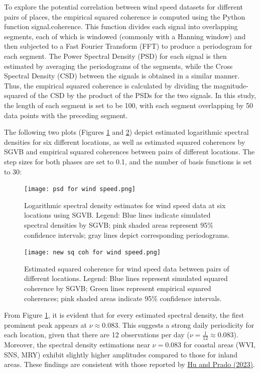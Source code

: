 \documentclass[12pt,a4paper]{article}
\begin{document}
To explore the potential correlation between wind speed datasets for different pairs of places, the empirical squared coherence is computed using the Python function signal.coherence. This function divides each signal into overlapping segments, each of which is windowed (commonly with a Hanning window) and then subjected to a Fast Fourier Transform (FFT) to produce a periodogram for each segment. The Power Spectral Density (PSD) for each signal is then estimated by averaging the periodograms of the segments, while the Cross Spectral Density (CSD) between the signals is obtained in a similar manner. Thus, the empirical squared coherence is calculated by dividing the magnitude-squared of the CSD by the product of the PSDs for the two signals. In this study, the length of each segment is set to be 100, with each segment overlapping by 50 data points with the preceding segment.

The following two plots (Figures \ref{wind speed psd} and \ref{wind speed coh}) depict estimated logarithmic spectral densities for six different locations, as well as estimated squared coherences by SGVB and empirical squared coherences between pairs of different locations. The step sizes for both phases are set to 0.1, and the number of basis functions is set to 30:
\begin{figure}[H]
\centering
\texttt{[image: psd for wind speed.png]}
\caption{Logarithmic spectral density estimates for wind speed data at six locations using SGVB. Legend: Blue lines indicate simulated spectral densities by SGVB; pink shaded areas represent 95\% confidence intervals; gray lines depict corresponding periodograms.}
\label{wind speed psd}
\end{figure}

\begin{figure}[H]
\centering
\texttt{[image: new sq coh for wind speed.png]}
\caption{Estimated squared coherence for wind speed data between pairs of different locations. Legend: Blue lines represent simulated squared coherence by SGVB; Green lines represent empirical squared coherences; pink shaded areas indicate 95\% confidence intervals.}
\label{wind speed coh}
\end{figure}

From Figure \ref{wind speed psd}, it is evident that for every estimated spectral density, the first prominent peak appears at $\nu \approx 0.083$. This suggests a strong daily periodicity for each location, given that there are 12 observations per day ($\nu = \frac{1}{12} \approx 0.083$). Moreover, the spectral density estimations near $\nu = 0.083$ for coastal areas (WVI, SNS, MRY) exhibit slightly higher amplitudes compared to those for inland areas. These findings are consistent with those reported by \hyperref[hu2023]{Hu and Prado (2023)}.
\end{document}
